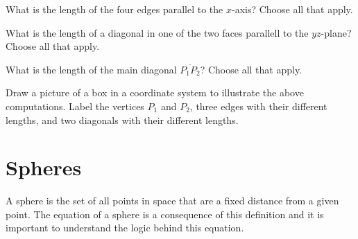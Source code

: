 \documentclass{ximera}
\begin{document}
\begin{question} \label{Q324tgtgt}
What is the length of the four edges parallel to the $x$-axis? Choose all that apply. 
\begin{selectAll}
\end{selectAll}
\end{question}

\begin{question} \label{Q32sdfdsftgt}
What is the length of a diagonal in one of the two faces parallell to the $yz$-plane? Choose all that apply. 
\begin{selectAll}
\end{selectAll}
\end{question}

\begin{question} \label{Q32sdfdsftgt}
What is the length of the main diagonal $\overline{P_1P_2}$? Choose all that apply. 
\begin{selectAll}
\end{selectAll}
\end{question}

\begin{question}  \label{Q:Kmm3454433}
\begin{freeResponse}
Draw a picture of a box in a coordinate system to illustrate the above computations. Label the vertices $P_1$ and $P_2$,  three edges with their different lengths, and two diagonals with their different lengths. 
\end{freeResponse}
\end{question}

\section*{Spheres}
A sphere is the set of all points in space that are a fixed distance from a given point. The equation of a sphere is a consequence of this definition and it is important to understand the logic behind this equation.
\end{document}
